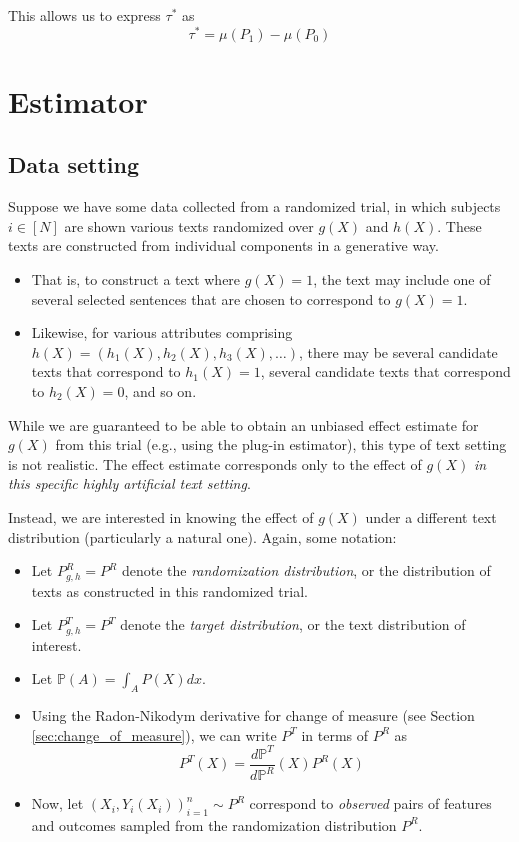 \documentclass{article}
\begin{document}
This allows us to express $\tau^*$ as
\begin{equation*}
    \boxed{\tau^* = \mu(P_1)-\mu(P_0)}
\end{equation*}

\section{Estimator}

\subsection{Data setting}

Suppose we have some data collected from a randomized trial, in which subjects $i \in [N]$ are shown various texts randomized over $g(X)$ and $h(X)$. These texts are constructed from individual components in a generative way. 
\begin{itemize}
    \item That is, to construct a text where $g(X)=1$, the text may include one of several selected sentences that are chosen to correspond to $g(X)=1$.
    \item Likewise, for various attributes comprising $h(X)=(h_1(X), h_2(X), h_3(X), \dots)$, there may be several candidate texts that correspond to $h_1(X)=1$, several candidate texts that correspond to $h_2(X)=0$, and so on.
\end{itemize}

While we are guaranteed to be able to obtain an unbiased effect estimate for $g(X)$ from this trial (e.g., using the plug-in estimator), this type of text setting is not realistic. The effect estimate corresponds only to the effect of $g(X)$ \textit{in this specific highly artificial text setting}.

Instead, we are interested in knowing the effect of $g(X)$ under a different text distribution (particularly a natural one). Again, some notation:

\begin{itemize}
    \item Let $P^R_{g,h} = P^R$ denote the \textit{randomization distribution}, or the distribution of texts as constructed in this randomized trial.
    \item Let $P^T_{g,h} = P^T$ denote the \textit{target distribution}, or the text distribution of interest.
    \item Let $\mathbb{P}(A) = \int_A P(X) dx$.
    \item Using the Radon-Nikodym derivative for change of measure (see Section \ref{sec:change_of_measure}), we can write $P^T$ in terms of $P^R$ as
    \begin{equation*}
        P^T(X) = \frac{d\mathbb{P}^T}{d\mathbb{P}^R}(X)P^R(X)
    \end{equation*}
    \item Now, let $(X_i,Y_i(X_i))_{i=1}^n \sim P^R$ correspond to \textit{observed} pairs of features and outcomes sampled from the randomization distribution $P^R$.
\end{itemize}
\end{document}
